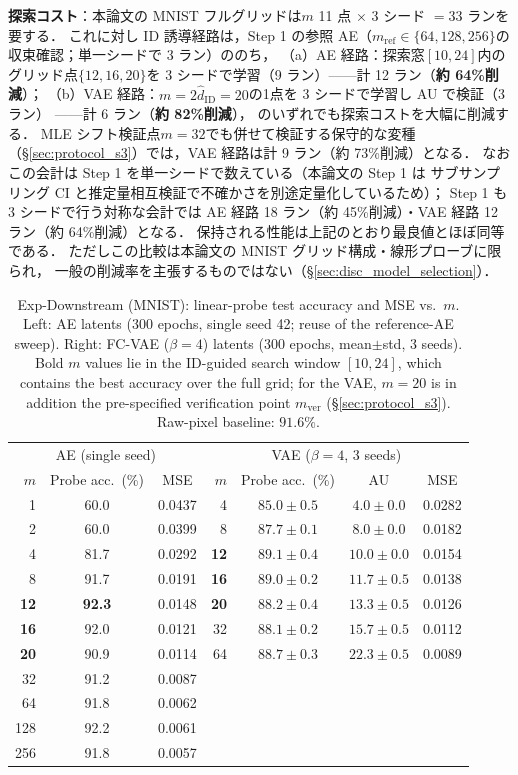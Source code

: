 \documentclass[11pt,a4paper]{jsarticle}
\newcommand{\hatdID}{\hat{d}_{\mathrm{ID}}}
\begin{document}
\textbf{探索コスト}：本論文の MNIST フルグリッドは$m$ 11 点
$\times$ 3 シード $= 33$ ランを要する．
これに対し ID 誘導経路は，Step 1 の参照 AE（$m_{\mathrm{ref}} \in \{64, 128, 256\}$の
収束確認；単一シードで 3 ラン）ののち，
（a）AE 経路：探索窓$[10, 24]$内のグリッド点$\{12, 16, 20\}$を
3 シードで学習（9 ラン）——計 12 ラン（\textbf{約 64\%削減}）；
（b）VAE 経路：$m = 2\hatdID = 20$の1点を 3 シードで学習し AU で検証（3 ラン）
——計 6 ラン（\textbf{約 82\%削減}），
のいずれでも探索コストを大幅に削減する．
MLE シフト検証点$m = 32$でも併せて検証する保守的な変種
（§\ref{sec:protocol_s3}）では，VAE 経路は計 9 ラン（約 73\%削減）となる．
なおこの会計は Step 1 を単一シードで数えている（本論文の Step 1 は
サブサンプリング CI と推定量相互検証で不確かさを別途定量化しているため）；
Step 1 も 3 シードで行う対称な会計では
AE 経路 18 ラン（約 45\%削減）・VAE 経路 12 ラン（約 64\%削減）となる．
保持される性能は上記のとおり最良値とほぼ同等である．
ただしこの比較は本論文の MNIST グリッド構成・線形プローブに限られ，
一般の削減率を主張するものではない（§\ref{sec:disc_model_selection}）．

\begin{table}[H]
\centering
\caption{Exp-Downstream (MNIST): linear-probe test accuracy and MSE vs.\ $m$.
Left: AE latents (300 epochs, single seed 42; reuse of the reference-AE
sweep). Right: FC-VAE ($\beta = 4$) latents (300 epochs, mean$\pm$std, 3
seeds). Bold $m$ values lie in the ID-guided search window $[10, 24]$,
which contains the best accuracy over the full grid; for the VAE, $m = 20$
is in addition the pre-specified verification point $m_{\mathrm{ver}}$
(§\ref{sec:protocol_s3}).
Raw-pixel baseline: $91.6\%$.}
\label{tab:downstream}
\small
\begin{tabular}{r cc | r ccc}
\toprule
\multicolumn{3}{c|}{AE (single seed)} & \multicolumn{4}{c}{VAE ($\beta = 4$, 3 seeds)} \\
$m$ & Probe acc.\ (\%) & MSE & $m$ & Probe acc.\ (\%) & AU & MSE \\
\midrule
1 & 60.0 & 0.0437 & 4 & $85.0 \pm 0.5$ & $4.0 \pm 0.0$ & 0.0282 \\
2 & 60.0 & 0.0399 & 8 & $87.7 \pm 0.1$ & $8.0 \pm 0.0$ & 0.0182 \\
4 & 81.7 & 0.0292 & \textbf{12} & $\boldsymbol{89.1 \pm 0.4}$ & $10.0 \pm 0.0$ & 0.0154 \\
8 & 91.7 & 0.0191 & \textbf{16} & $89.0 \pm 0.2$ & $11.7 \pm 0.5$ & 0.0138 \\
\textbf{12} & \textbf{92.3} & 0.0148 & \textbf{20} & $88.2 \pm 0.4$ & $13.3 \pm 0.5$ & 0.0126 \\
\textbf{16} & 92.0 & 0.0121 & 32 & $88.1 \pm 0.2$ & $15.7 \pm 0.5$ & 0.0112 \\
\textbf{20} & 90.9 & 0.0114 & 64 & $88.7 \pm 0.3$ & $22.3 \pm 0.5$ & 0.0089 \\
32 & 91.2 & 0.0087 &  & & & \\
64 & 91.8 & 0.0062 &  & & & \\
128 & 92.2 & 0.0061 &  & & & \\
256 & 91.8 & 0.0057 &  & & & \\
\bottomrule
\end{tabular}
\end{table}
\end{document}
